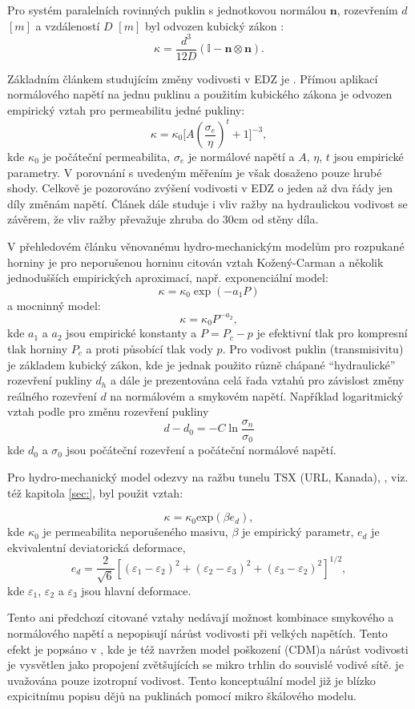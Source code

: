 \documentclass{article}
\def\vc#1{\mathbf{\boldsymbol{#1}}}     %
\def\tn#1{{\mathbb{#1}}}    %
\begin{document}
Pro systém paralelních rovinných puklin s jednotkovou normálou $\vc n$, rozevřením $d$ $[m]$ a vzdáleností $D$ $[m]$
byl odvozen kubický zákon \cite{Snow1969}:
\[
 \kappa = \frac{d^3}{12 D} (\tn I - \vc n \otimes \vc n).
\]

Základním článkem studujícím změny vodivosti v EDZ je \cite{Kelsall1984}. Přímou aplikací normálového napětí
na jednu puklinu a použitím kubického zákona je odvozen empirický vztah pro permeabilitu jedné pukliny:
\[
  \kappa = \kappa_0 \Big[A (\frac{\sigma_e}{\eta})^t+1\Big]^{-3},
\]
kde $\kappa_0$ je počáteční permeabilita, $\sigma_e$ je normálové napětí a $A$, $\eta$, $t$ jsou empirické parametry.
V porovnání s uvedeným měřením je však dosaženo pouze hrubé shody. Celkově je pozorováno zvýšení vodivosti v EDZ o jeden až dva řády jen díly změnám napětí.
Článek dále studuje i vliv ražby na hydraulickou vodivost se závěrem, že vliv ražby převažuje zhruba do 30cm od stěny díla. 


V přehledovém článku \cite{Rutqvist2003} věnovanému hydro-mechanickým modelům pro rozpukané horniny
je pro neporušenou horninu citován vztah Kožený-Carman a několik jednodušších empirických aproximací, např.
exponenciální model:
\[
  \kappa=\kappa_0 \exp(-a_1 P)
\]
a 
mocninný model:
\[
  \kappa=\kappa_0 P^{-a_2},
\]
kde $a_1$ a $a_2$ jsou empirické konstanty a $P=P_c - p$ je efektivní tlak pro kompresní tlak horniny $P_c$ a proti působící tlak vody $p$.
Pro vodivost puklin (transmisivitu) je základem kubický zákon, kde je jednak použito různě chápané ``hydraulické'' rozevření pukliny $d_h$ 
a dále je prezentována celá řada vztahů pro závislost změny reálného rozevření $d$ na normálovém a smykovém napětí. Například logaritmický vztah 
podle \cite{Kohl1995} pro změnu rozevření pukliny
\[
   d - d_0 = - C \ln \frac{\sigma_n}{\sigma_0}
\]
kde $d_0$ a $\sigma_0$ jsou počáteční rozevření a počáteční normálové napětí. 

Pro hydro-mechanický model odezvy na ražbu tunelu TSX (URL, Kanada), \cite{Rutqvist2009}, viz. též kapitola \ref{sec:}, byl použit vztah:

$$
	\kappa = \kappa_0 \mbox{exp}(\beta e_d),
$$
kde $\kappa_0$ je permeabilita neporušeného masivu, $\beta$ je empirický parametr, $e_d$ je ekvivalentní
deviatorická deformace,
$$
	e_d = \frac{2}{\sqrt{6}}[(\varepsilon_1 - \varepsilon_2)^2 + (\varepsilon_2 - \varepsilon_3)^2 + (\varepsilon_3 - \varepsilon_2)^2]^{1/2},
$$
kde $\varepsilon_1$, $\varepsilon_2$ a $\varepsilon_3$ jsou hlavní deformace.


Tento ani předchozí citované vztahy nedávají možnost kombinace smykového a normálového napětí a nepopisují 
nárůst vodivosti při velkých napětích. Tento efekt je popsáno v \cite{Souley2001}, kde je též navržen model poškození (CDM)a 
nárůst vodivosti je vysvětlen jako propojení zvětšujících se mikro trhlin do souvislé vodivé sítě.
je uvažována pouze izotropní vodivost. Tento konceptuální model již je blízko expicitnímu popisu dějů na puklinách 
pomocí mikro škálového modelu.
\end{document}
